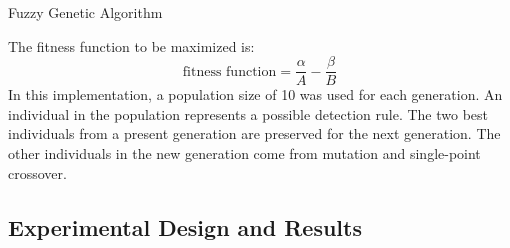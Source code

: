 \documentclass{sig-alternate}
\begin{document}
\begin{algorithm}
\caption{Fuzzy Genetic Algorithm}
\label{alg:fuzGenAlg}
\begin{algorithmic}

    \ENDFOR
    
      \ELSE {}
    \ENDIF
  \ENDFOR
  
\ENDFOR
{}
\end{algorithmic}
\end{algorithm}


The fitness function to be maximized is:
\begin{equation*}
\textrm{fitness function} = \frac{\alpha}{A} - \frac{\beta}{B}
\end{equation*}
In this implementation, a population size of 10 was used for each generation. An individual in the population represents a possible detection rule. The two best individuals from a present generation are preserved for the next generation. The other individuals in the new generation come from mutation and single-point crossover.




\subsection{Experimental Design and Results}
\end{document}
